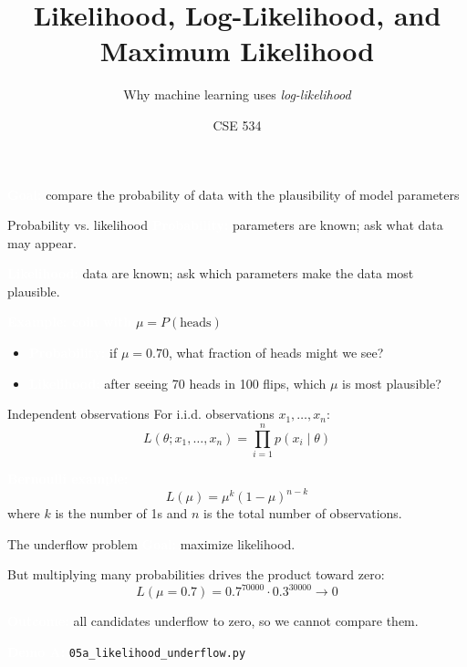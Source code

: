 \documentclass[aspectratio=169]{beamer}
\title{Likelihood, Log-Likelihood, and Maximum Likelihood}
\subtitle{Why machine learning uses \emph{log-likelihood}}
\author{CSE 534}
\date{}
\renewcommand{\textbf}[1]{\textcolor{white}{\bfseries #1}}
\begin{document}
\begin{frame}
\titlepage
\begin{center}
\textbf{Goal:} compare the probability of data with the plausibility of model parameters
\end{center}
\end{frame}

\begin{frame}[c]{Probability vs. likelihood}
\textbf{Probability:} parameters are known; ask what data may appear.

\vspace{0.5em}
\textbf{Likelihood:} data are known; ask which parameters make the data most plausible.

\vspace{1em}
\textbf{Example: coin with } $\mu = P(\text{heads})$
\begin{itemize}
    \item \textbf{Probability:} if $\mu=0.70$, what fraction of heads might we see?
    \item \textbf{Likelihood:} after seeing 70 heads in 100 flips, which $\mu$ is most plausible?
\end{itemize}
\end{frame}

\begin{frame}[c]{Independent observations}
For i.i.d. observations $x_1, \ldots, x_n$:
\[
L(\theta; x_1, \ldots, x_n) = \prod_{i=1}^n p(x_i \mid \theta)
\]

\vspace{0.5em}
\textbf{Bernoulli example:}
\[
L(\mu) = \mu^k (1-\mu)^{n-k}
\]
where $k$ is the number of 1s and $n$ is the total number of observations.
\end{frame}

\begin{frame}[c]{The underflow problem}
\textbf{Goal:} maximize likelihood.

\vspace{0.5em}
But multiplying many probabilities drives the product toward zero:
\[
L(\mu=0.7)=0.7^{70000}\cdot 0.3^{30000} \rightarrow 0
\]

\vspace{0.5em}
\textbf{Outcome:} all candidates underflow to zero, so we cannot compare them.

\vspace{0.5em}
\textbf{Demo A:} \texttt{05a\_likelihood\_underflow.py}
\end{frame}
\end{document}
